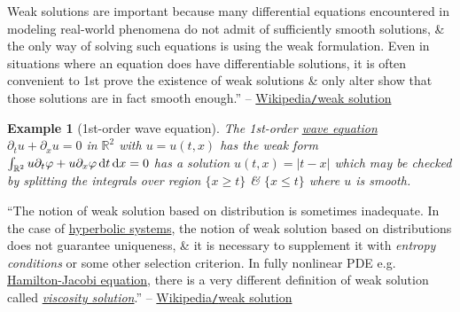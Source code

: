 \documentclass{article}
\newtheorem{example}{Example}
\begin{document}
Weak solutions are important because many differential equations encountered in modeling real-world phenomena do not admit of sufficiently smooth solutions, \& the only way of solving such equations is using the weak formulation. Even in situations where an equation does have differentiable solutions, it is often convenient to 1st prove the existence of weak solutions \& only alter show that those solutions are in fact smooth enough.'' -- \href{https://en.wikipedia.org/wiki/Weak_solution}{Wikipedia{\tt/}weak solution}

\begin{example}[1st-order wave equation]
	The 1st-order \href{https://en.wikipedia.org/wiki/Wave_equation}{wave equation} $\partial_tu + \partial_xu = 0$ in $\mathbb{R}^2$ with $u = u(t,x)$ has the weak form $\int_{\mathbb{R}^2} u\partial_t\varphi + u\partial_x\varphi\,{\rm d}t\,{\rm d}x = 0$ has a solution $u(t,x) = |t - x|$ which may be checked by splitting the integrals over region $\{x\ge t\}$ \& $\{x\le t\}$ where $u$ is smooth.
\end{example}
``The notion of weak solution based on distribution is sometimes inadequate. In the case of \href{https://en.wikipedia.org/wiki/Hyperbolic_system}{hyperbolic systems}, the notion of weak solution based on distributions does not guarantee uniqueness, \& it is necessary to supplement it with {\it entropy conditions} or some other selection criterion. In fully nonlinear PDE e.g. \href{https://en.wikipedia.org/wiki/Hamilton%E2%80%93Jacobi_equation}{Hamilton-Jacobi equation}, there is a very different definition of weak solution called \href{https://en.wikipedia.org/wiki/Viscosity_solution}{\it viscosity solution}.'' -- \href{https://en.wikipedia.org/wiki/Weak_solution}{Wikipedia{\tt/}weak solution}
\end{document}
